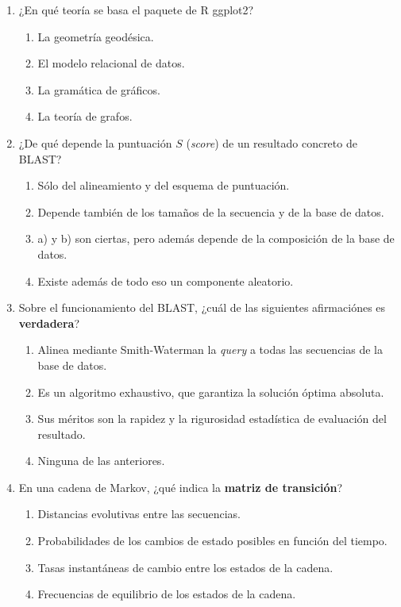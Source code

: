 \documentclass[a4paper,12pt]{article}
\begin{document}
\begin{enumerate}
\item ¿En qué teoría se basa el paquete de R \textsf{ggplot2}?
   \begin{enumerate}
   \item La geometría geodésica.
   \item El modelo relacional de datos.
   \item La gramática de gráficos.
   \item La teoría de grafos.
   \end{enumerate}

\item ¿De qué depende la puntuación $S$ (\emph{score}) de un resultado concreto de BLAST?
   \begin{enumerate}
   \item Sólo del alineamiento y del esquema de puntuación.
   \item Depende también de los tamaños de la secuencia y de la base de datos.
   \item a) y b) son ciertas, pero además depende de la composición de la base de datos.
   \item Existe además de todo eso un componente aleatorio.
   \end{enumerate}

\item Sobre el funcionamiento del BLAST, ¿cuál de las siguientes afirmaciónes es \textbf{verdadera}?
   \begin{enumerate}
   \item Alinea mediante Smith-Waterman la \emph{query} a todas las secuencias de la base de datos.
   \item Es un algoritmo exhaustivo, que garantiza la solución óptima absoluta.
   \item Sus méritos son la rapidez y la rigurosidad estadística de evaluación del resultado.
   \item Ninguna de las anteriores.
   \end{enumerate}

\item En una cadena de Markov, ¿qué indica la \textbf{matriz de transición}?
   \begin{enumerate}
   \item Distancias evolutivas entre las secuencias.
   \item Probabilidades de los cambios de estado posibles en función del tiempo.
   \item Tasas instantáneas de cambio entre los estados de la cadena.
   \item Frecuencias de equilibrio de los estados de la cadena.
   \end{enumerate}


\end{enumerate}
\end{document}
